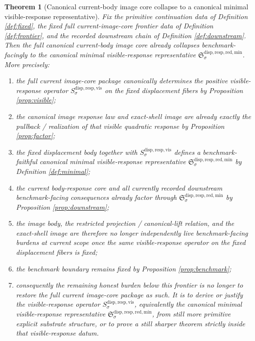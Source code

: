 \documentclass[11pt]{article}
\newcommand{\VisibleResponseOperator}[1]{S_{#1}^{\mathrm{disp,resp,vis}}}
\newcommand{\MinimalReducedStructure}{\mathfrak S^{\mathrm{disp,resp,red,min}}}
\newtheorem{theorem}{Theorem}
\begin{document}
\begin{theorem}[Canonical current-body image core collapse to a canonical minimal visible-response representative]
\label{thm:main}
Fix the primitive continuation data of Definition \ref{def:fixed}, the fixed full current-image-core frontier data of Definition \ref{def:frontier}, and the recorded downstream chain of Definition \ref{def:downstream}. Then the full canonical current-body image core already collapses benchmark-facingly to the canonical minimal visible-response representative \(\MinimalReducedStructure_{\sigma}\). More precisely:
\begin{enumerate}
    \item the full current image-core package canonically determines the positive visible-response operator \(\VisibleResponseOperator{\sigma}\) on the fixed displacement fibers by Proposition \ref{prop:visible};
    \item the canonical image response law and exact-shell image are already exactly the pullback / realization of that visible quadratic response by Proposition \ref{prop:factor};
    \item the fixed displacement body together with \(\VisibleResponseOperator{\sigma}\) defines a benchmark-faithful canonical minimal visible-response representative \(\MinimalReducedStructure_{\sigma}\) by Definition \ref{def:minimal};
    \item the current body-response core and all currently recorded downstream benchmark-facing consequences already factor through \(\MinimalReducedStructure_{\sigma}\) by Proposition \ref{prop:downstream};
    \item the image body, the restricted projection / canonical-lift relation, and the exact-shell image are therefore no longer independently live benchmark-facing burdens at current scope once the same visible-response operator on the fixed displacement fibers is fixed;
    \item the benchmark boundary remains fixed by Proposition \ref{prop:benchmark};
    \item consequently the remaining honest burden below this frontier is no longer to restore the full current image-core package as such. It is to derive or justify the visible-response operator \(\VisibleResponseOperator{\sigma}\), equivalently the canonical minimal visible-response representative \(\MinimalReducedStructure_{\sigma}\), from still more primitive explicit substrate structure, or to prove a still sharper theorem strictly inside that visible-response datum.
\end{enumerate}
\end{theorem}
\end{document}
